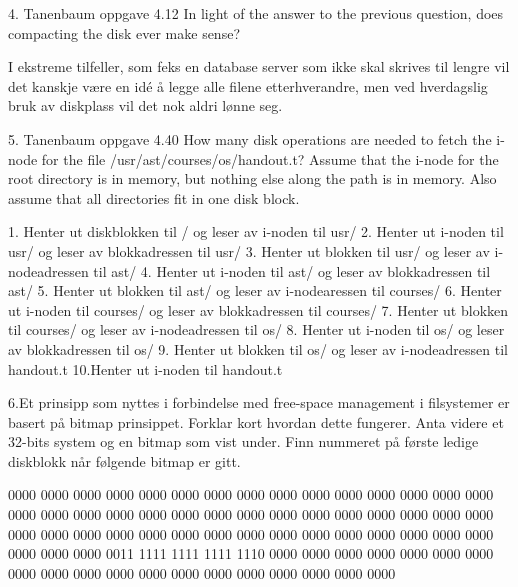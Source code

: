 4. Tanenbaum oppgave 4.12
In light of the answer to the previous question, does compacting the disk ever make sense?

I ekstreme tilfeller, som feks en database server som ikke skal skrives til lengre vil det kanskje være en idé å legge alle filene etterhverandre, men ved hverdagslig bruk av diskplass vil det nok aldri lønne seg.

5. Tanenbaum oppgave 4.40
How many disk operations are needed to fetch the i-node for the file /usr/ast/courses/os/handout.t? Assume that the i-node for the root directory is in memory, but nothing else along the path is in memory. Also assume that all directories fit in one disk block.

1. Henter ut diskblokken til / og leser av i-noden til usr/
2. Henter ut i-noden til usr/ og leser av blokkadressen til usr/
3. Henter ut blokken til usr/ og leser av i-nodeadressen til ast/
4. Henter ut i-noden til  ast/ og leser av blokkadressen til ast/
5. Henter ut blokken til ast/ og leser av i-nodearessen til courses/
6. Henter ut i-noden til courses/ og leser av blokkadressen til courses/
7. Henter ut blokken til courses/ og leser av i-nodeadressen til os/
8. Henter ut i-noden til os/ og leser av blokkadressen til os/
9. Henter ut blokken til os/ og leser av i-nodeadressen til handout.t
10.Henter ut i-noden til handout.t

6.Et prinsipp som nyttes i forbindelse med free-space management i filsystemer er basert på bitmap prinsippet. Forklar kort hvordan dette fungerer. Anta videre et 32-bits system og en bitmap som vist under. 
Finn nummeret på første ledige diskblokk når følgende bitmap er gitt.

0000 0000 0000 0000 0000 0000 0000 0000
0000 0000 0000 0000 0000 0000 0000 0000
0000 0000 0000 0000 0000 0000 0000 0000
0000 0000 0000 0000 0000 0000 0000 0000
0000 0000 0000 0000 0000 0000 0000 0000
0000 0000 0000 0000 0000 0000 0000 0000
0011 1111 1111 1111 1110 0000 0000 0000
0000 0000 0000 0000 0000 0000 0000 0000
0000 0000 0000 0000 0000 0000 0000 0000

